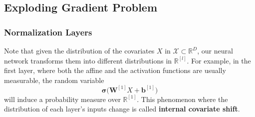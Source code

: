 \documentclass{article}
\theoremstyle{definition}
\theoremstyle{remark}
\theoremstyle{definition}
\begin{document}
  \subsection{Exploding Gradient Problem}

    \subsubsection{Normalization Layers}

      Note that given the distribution of the covariates $X$ in $\mathcal{X} \subset \mathbb{R}^D$, our neural network transforms them into different distributions in $\mathbb{R}^{[l]}$. For example, in the first layer, where both the affine and the activation functions are usually measurable, the random variable 
      \[\boldsymbol{\sigma} \big( \mathbf{W}^{[1]} X + \mathbf{b}^{[1]} \big)\]
      will induce a probability measure over $\mathbb{R}^{[1]}$. This phenomenon where the distribution of each layer's inputs change is called \textbf{internal covariate shift}. 
\end{document}
